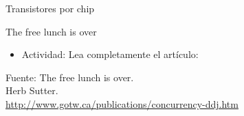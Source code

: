 \begin{frame}[t]{Transistores por chip}
    \begin{center}
    \end{center}
\end{frame}

\begin{frame}[t]{The free lunch is over}
    \begin{itemize}
      \item Actividad: Lea completamente el artículo:
    \end{itemize}
    \vspace{2em}
    Fuente: \alert{The free lunch is over}.\\
    Herb Sutter.\\
    \url{http://www.gotw.ca/publications/concurrency-ddj.htm}\\
\end{frame}

